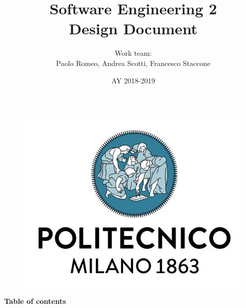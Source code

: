\documentclass{article}
\begin{document}
	\begin{figure}
  	\includegraphics[width=\linewidth]{../images/Logo-PoliMi.jpg}
	\end{figure}
	\title{\textbf{Software Engineering 2\\Design Document}}
	\author{Work team:\\Paolo Romeo, Andrea Scotti, Francesco Staccone}
	\date{AY 2018-2019}
	\maketitle{}

	\newpage
	
	\textbf{Table of contents}
\end{document}
